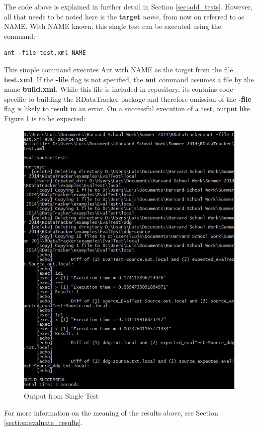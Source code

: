 \documentclass[12pt]{article}
\begin{document}
The code above is explained in further detail in Section \ref{sec:add_tests}. However, all that needs to be noted here is the \textbf{target} \textit{name}, from now on referred to as NAME. With NAME known, this single test can be executed using the command:

\begin{lstlisting}
ant -file test.xml NAME
\end{lstlisting}
This simple command executes Ant with NAME as the target from the file \textbf{test.xml}. If the \textbf{-file} flag is not specified, the \textbf{ant} command assumes a file by the name \textbf{build.xml}. While this file is included in repository, its contains code specific to building the RDataTracker package and therefore omission of the \textbf{-file} flag is likely to result in an error. On a successful execution of a test, output like Figure \ref{fig:single_test_out} is to be expected:

\begin{figure}[!ht]
\caption{Output from Single Test}
\label{fig:single_test_out}
\begin{center}
\includegraphics[scale=0.4]{UsingRDataTrackerTests-img/single-test-out.PNG}
\end{center}
\end{figure}
For more information on the meaning of the results above, see Section \ref{section:evaluate_results}.
\end{document}
